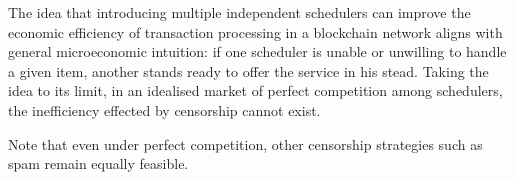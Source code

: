 \begin{remark}

  The idea that introducing multiple independent schedulers can improve the economic efficiency of transaction processing in a blockchain network aligns with general microeconomic intuition: if one scheduler is unable or unwilling to handle a given item, another stands ready to offer the service in his stead.
  Taking the idea to its limit, in an idealised market of perfect competition among schedulers, the inefficiency effected by censorship cannot exist.

  Note that even under perfect competition, other censorship strategies such as spam remain equally feasible.

\end{remark}


